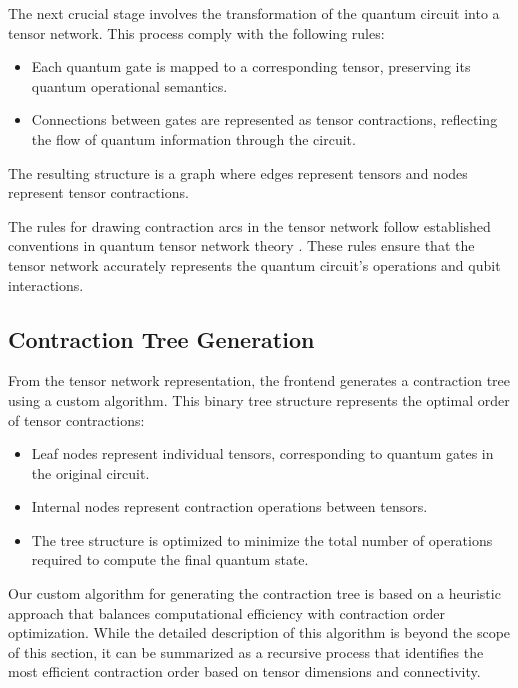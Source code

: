 \documentclass[12pt,oneside,a4paper]{article}
\begin{document}
The next crucial stage involves the transformation of the quantum circuit into a tensor network. This process comply with the following rules:

\begin{itemize}
    \item Each quantum gate is mapped to a corresponding tensor, preserving its quantum operational semantics.
    \item Connections between gates are represented as tensor contractions, reflecting the flow of quantum information through the circuit.
\end{itemize}

The resulting structure is a graph where edges represent tensors and nodes represent tensor contractions.

The rules for drawing contraction arcs in the tensor network follow established conventions in quantum tensor network theory \cite{biamonte2017tensornetworksnutshell}. These rules ensure that the tensor network accurately represents the quantum circuit's operations and qubit interactions.

\subsection{Contraction Tree Generation}

From the tensor network representation, the frontend generates a contraction tree using a custom algorithm. This binary tree structure represents the optimal order of tensor contractions:

\begin{itemize}
    \item Leaf nodes represent individual tensors, corresponding to quantum gates in the original circuit.
    \item Internal nodes represent contraction operations between tensors.
    \item The tree structure is optimized to minimize the total number of operations required to compute the final quantum state.
\end{itemize}

Our custom algorithm for generating the contraction tree is based on a heuristic approach that balances computational efficiency with contraction order optimization. While the detailed description of this algorithm is beyond the scope of this section, it can be summarized as a recursive process that identifies the most efficient contraction order based on tensor dimensions and connectivity.
\end{document}
